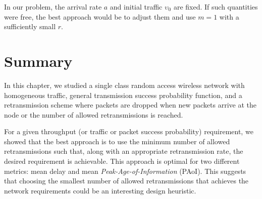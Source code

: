 
\begin{remark}
    In our problem, the arrival rate $a$ and initial traffic $\upsilon_0$ are fixed. If such quantities were free, the best approach would be to adjust them and use $m=1$ with a sufficiently small $r$.
\end{remark}

\section{Summary} \label{sec:summ_P2_02}

In this chapter, we studied a single class random access wireless network with homogeneous traffic, general transmission success probability function, and a retransmission scheme where packets are dropped when new packets arrive at the node or the number of allowed retransmissions is reached.

For a given throughput (or traffic or packet success probability) requirement, we showed that the best approach is to use the minimum number of allowed retransmissions such that, along with an appropriate retransmission rate, the desired requirement is achievable.
%
This approach is optimal for two different metrics: mean delay and mean \textit{Peak-Age-of-Information} (PAoI).
%
This suggests that choosing the smallest number of allowed retransmissions that achieves the network requirements could be an interesting design heuristic.